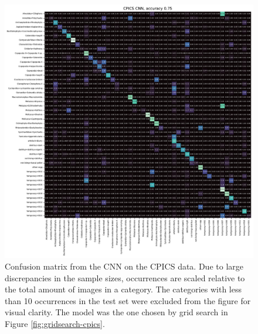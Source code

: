 \begin{figure}
    \centering
    \includegraphics[width=\linewidth]{examples/tests_even/figs/cpics-confusion2024-12-09_1113_above10_rel.pdf}
    \caption{Confusion matrix from the CNN on the CPICS data. Due to large discrepancies in the sample sizes, occurrences are scaled relative to the total amount of images in a category. The categories with less than 10 occurrences in the test set were excluded from the figure for visual clarity. The model was the one chosen by grid search in Figure \ref{fig:gridsearch-cpics}.}
    \label{fig:confusion-cpics}
\end{figure}



